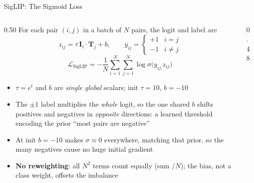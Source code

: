 \begin{frame}{SigLIP: The Sigmoid Loss}

  \begin{columns}
    \begin{column}{0.50\textwidth}
      For each pair $(i,j)$ in a batch of $N$ pairs, the logit and label are
      \[ z_{ij} = \tau\,\mathbf{I}_i\cdot\mathbf{T}_j + b, \qquad
         y_{ij} = \begin{cases} +1 & i=j \\ -1 & i\neq j \end{cases} \]
      \[ \mathcal{L}_{\text{SigLIP}} = -\frac{1}{N}\sum_{i=1}^{N}\sum_{j=1}^{N}
         \log \sigma\!\big(y_{ij}\,z_{ij}\big) \]

      \begin{itemize}
        \item $\tau=e^{t}$ and $b$ are \emph{single global} scalars; init $\tau{=}10$, $b{=}{-}10$
        \item The $\pm1$ label multiplies the \emph{whole} logit, so the one shared $b$ shifts positives and negatives in \emph{opposite} directions: a learned threshold encoding the prior ``most pairs are negative''
        \item At init $b{=}{-}10$ makes $\sigma\!\approx\!0$ everywhere, matching that prior, so the many negatives cause no huge initial gradient
        \item \textbf{No reweighting}: all $N^2$ terms count equally (sum $/N$); the bias, not a class weight, offsets the imbalance
      \end{itemize}
    \end{column}
    \begin{column}{0.48\textwidth}
      \begin{center}
\end{center}
\end{column}
\end{columns}
\end{frame}
